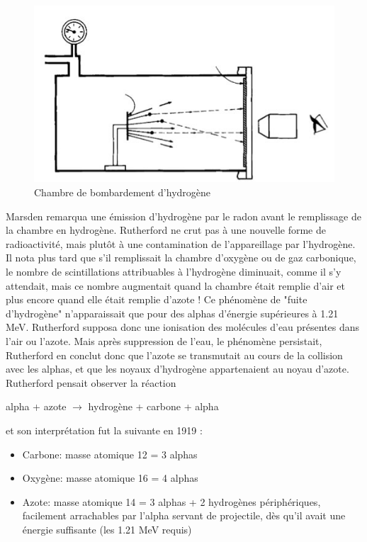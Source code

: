     \begin{figure}[ht]
        \centering
        \includegraphics[scale=0.75]{Images1/bombardement.PNG}
        \caption{Chambre de bombardement d'hydrogène}
    \end{figure}
    
    Marsden remarqua une émission d'hydrogène par le radon avant le remplissage de la chambre en hydrogène. Rutherford ne crut pas à une nouvelle forme de radioactivité, mais plutôt à une contamination de l'appareillage par l'hydrogène. Il nota plus tard que s'il remplissait la chambre d'oxygène ou de gaz carbonique, le nombre de scintillations attribuables à l'hydrogène diminuait, comme il s'y attendait, mais ce nombre augmentait quand la chambre était remplie d'air et plus encore quand elle était remplie d'azote ! Ce phénomène de "fuite d'hydrogène" n'apparaissait que pour des alphas d'énergie supérieures à 1.21 MeV. Rutherford supposa donc une ionisation des molécules d'eau présentes dans l'air ou l'azote. Mais après suppression de l'eau, le phénomène persistait, Rutherford en conclut donc que l'azote se transmutait au cours de la collision avec les alphas, et que les noyaux d'hydrogène appartenaient au noyau d'azote. Rutherford pensait observer la réaction \\
    
    \begin{center}
        alpha + azote $\rightarrow$ hydrogène + carbone + alpha
    \end{center}
    
    et son interprétation fut la suivante en 1919 :

    \begin{itemize}
        \item Carbone: masse atomique 12 = 3 alphas
        \item Oxygène: masse atomique 16 = 4 alphas
        \item Azote: masse atomique 14 = 3 alphas + 2 hydrogènes périphériques, facilement arrachables par l’alpha servant de projectile, dès qu’il avait une énergie suffisante (les 1.21 MeV requis)
    \end{itemize}

